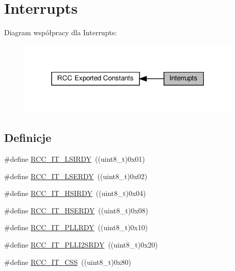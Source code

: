 \hypertarget{group___r_c_c___interrupt}{}\section{Interrupts}
\label{group___r_c_c___interrupt}
Diagram współpracy dla Interrupts\+:\nopagebreak
\begin{figure}[H]
\begin{center}
\leavevmode
\includegraphics[width=303pt]{group___r_c_c___interrupt}
\end{center}
\end{figure}
\subsection*{Definicje}
\begin{DoxyCompactItemize}
\item 
\#define \hyperlink{group___r_c_c___interrupt_ga2b4ef277c1b71f96e0bef4b9a72fca94}{R\+C\+C\+\_\+\+I\+T\+\_\+\+L\+S\+I\+R\+DY}~((uint8\+\_\+t)0x01)
\item 
\#define \hyperlink{group___r_c_c___interrupt_gad6b6e78a426850f595ef180d292a673d}{R\+C\+C\+\_\+\+I\+T\+\_\+\+L\+S\+E\+R\+DY}~((uint8\+\_\+t)0x02)
\item 
\#define \hyperlink{group___r_c_c___interrupt_ga69637e51b71f73f519c8c0a0613d042f}{R\+C\+C\+\_\+\+I\+T\+\_\+\+H\+S\+I\+R\+DY}~((uint8\+\_\+t)0x04)
\item 
\#define \hyperlink{group___r_c_c___interrupt_gad13eaede352bca59611e6cae68665866}{R\+C\+C\+\_\+\+I\+T\+\_\+\+H\+S\+E\+R\+DY}~((uint8\+\_\+t)0x08)
\item 
\#define \hyperlink{group___r_c_c___interrupt_ga68d48e7811fb58f2649dce6cf0d823d9}{R\+C\+C\+\_\+\+I\+T\+\_\+\+P\+L\+L\+R\+DY}~((uint8\+\_\+t)0x10)
\item 
\#define \hyperlink{group___r_c_c___interrupt_ga6468ff3bad854272cf1120ffbf69b7ac}{R\+C\+C\+\_\+\+I\+T\+\_\+\+P\+L\+L\+I2\+S\+R\+DY}~((uint8\+\_\+t)0x20)
\item 
\#define \hyperlink{group___r_c_c___interrupt_ga9bb34a4912d2084dc1c0834eb53aa7a3}{R\+C\+C\+\_\+\+I\+T\+\_\+\+C\+SS}~((uint8\+\_\+t)0x80)
\end{DoxyCompactItemize}



